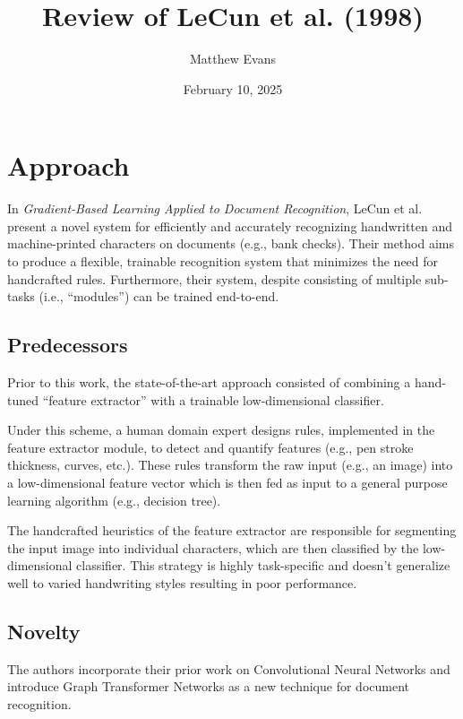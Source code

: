 \documentclass[10pt]{article}
\title{
    Review of LeCun et al. (1998) \\
}
\author{Matthew Evans}
\date{February 10, 2025}
\begin{document}
\maketitle

\section*{Approach}
In \textit{Gradient-Based Learning Applied to Document Recognition}\cite{lecun1998gradient}, LeCun et al. present a novel system for efficiently and accurately recognizing handwritten and machine-printed characters on documents (e.g., bank checks). Their method aims to produce a flexible, trainable recognition system that minimizes the need for handcrafted rules. Furthermore, their system, despite consisting of multiple sub-tasks (i.e., ``modules'') can be trained end-to-end.


\subsection*{Predecessors}


Prior to this work, the state-of-the-art approach consisted of combining a hand-tuned ``feature extractor'' with a trainable low-dimensional classifier.

Under this scheme, a human domain expert designs rules, implemented in the feature extractor module, to detect and quantify features (e.g., pen stroke thickness, curves, etc.). These rules transform the raw input (e.g., an image) into a low-dimensional feature vector which is then fed as input to a general purpose learning algorithm (e.g., decision tree).

The handcrafted heuristics of the feature extractor are responsible for segmenting the input image into individual characters, which are then classified by the low-dimensional classifier. This strategy is highly task-specific and doesn't generalize well to varied handwriting styles resulting in poor performance.


\subsection*{Novelty}
The authors incorporate their prior work on Convolutional Neural Networks\cite{10.1162/neco.1989.1.4.541} and introduce Graph Transformer Networks as a new technique for document recognition.
\end{document}
